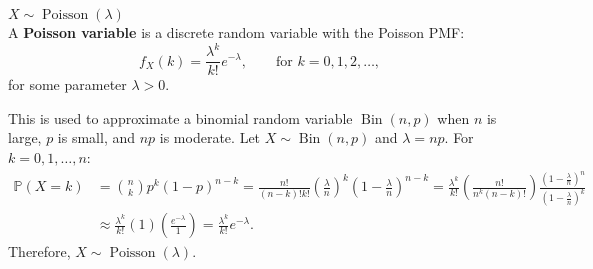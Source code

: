 \documentclass{huhtakm-template-book-v2}
\newcommand{\prob}{\mathbb{P}}
\DeclareMathOperator{\Bin}{Bin}
\DeclareMathOperator{\Poisson}{Poisson}
\begin{document}
    \begin{eg} $X \sim \Poisson(\lambda)$\\
        A \textbf{Poisson variable} is a discrete random variable with the Poisson PMF:
        \begin{equation*}
            f_{X}(k) = \frac{\lambda^{k}}{k!}e^{-\lambda}, \qquad\text{for }k = 0,1,2,\dots,
        \end{equation*}
        for some parameter $\lambda > 0$.
    \end{eg}
    \begin{rem}
        This is used to approximate a binomial random variable $\Bin(n,p)$ when $n$ is large, $p$ is small, and $np$ is moderate. Let $X \sim \Bin(n,p)$ and $\lambda = np$. For $k = 0,1,\dots,n$:
        \begin{align*}
            \prob(X = k) &= \binom{n}{k}p^{k}(1-p)^{n-k} = \frac{n!}{(n-k)!k!}\left(\frac{\lambda}{n}\right)^{k}\left(1-\frac{\lambda}{n}\right)^{n-k} = \frac{\lambda^{k}}{k!}\left(\frac{n!}{n^{k}(n-k)!}\right)\frac{\left(1-\frac{\lambda}{n}\right)^{n}}{\left(1-\frac{\lambda}{n}\right)^{k}}\\
            &\approx \frac{\lambda^{k}}{k!}(1)\left(\frac{e^{-\lambda}}{1}\right) = \frac{\lambda^{k}}{k!}e^{-\lambda}.
        \end{align*}
        Therefore, $X \sim \Poisson(\lambda)$.
    \end{rem}
    \newpage
    
\end{document}
